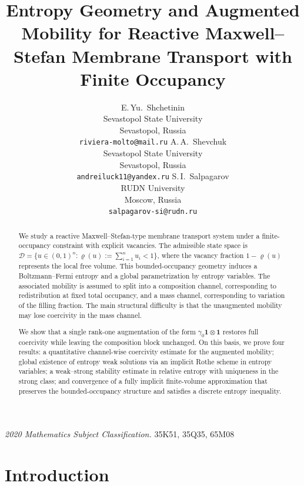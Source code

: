 \documentclass{article}
\title{Entropy Geometry and Augmented Mobility for
       Reactive Maxwell--Stefan Membrane Transport with Finite Occupancy}
\author{%
  E.\,Yu.~Shchetinin \\
  Sevastopol State University \\
  Sevastopol, Russia \\
  \texttt{riviera-molto@mail.ru}
  \And
  A.\,A.~Shevchuk \\
  Sevastopol State University \\
  Sevastopol, Russia \\
  \texttt{andreiluck11@yandex.ru}
  \AND
  S.\,I.~Salpagarov \\
  RUDN University \\
  Moscow, Russia \\
  \texttt{salpagarov-si@rudn.ru}
}
\newcommand{\bone}{\mathbf{1}}
\newcommand{\D}{\mathcal{D}}
\newcommand{\subjclass}[2][2020]{%
  \par\addvspace\medskipamount
  {\small\textit{2020 Mathematics Subject Classification.} #2\par}}
\begin{document}
\maketitle

\begin{abstract}
We study a reactive Maxwell--Stefan-type membrane transport system under
a finite-occupancy constraint with explicit vacancies. The admissible state
space is
$\D = \{u \in (0,1)^n : \varrho(u) := \sum_{i=1}^n u_i < 1\}$,
where the vacancy fraction $1-\varrho(u)$ represents the local free volume.
This bounded-occupancy geometry induces a Boltzmann--Fermi entropy and a
global parametrization by entropy variables. The associated mobility is
assumed to split into a composition channel, corresponding to redistribution
at fixed total occupancy, and a mass channel, corresponding to variation of
the filling fraction. The main structural difficulty is that the unaugmented
mobility may lose coercivity in the mass channel.

We show that a single rank-one augmentation of the form $\gamma_0\bone\otimes\bone$
restores full coercivity while leaving the composition block unchanged. On
this basis, we prove four results: a quantitative channel-wise coercivity
estimate for the augmented mobility; global existence of entropy weak
solutions via an implicit Rothe scheme in entropy variables; a weak--strong
stability estimate in relative entropy with uniqueness in the strong class;
and convergence of a fully implicit finite-volume approximation that
preserves the bounded-occupancy structure and satisfies a discrete entropy
inequality.
\end{abstract}


\subjclass[2020]{35K51, 35Q35, 65M08}

\section{Introduction}
\label{sec:intro}
\end{document}
